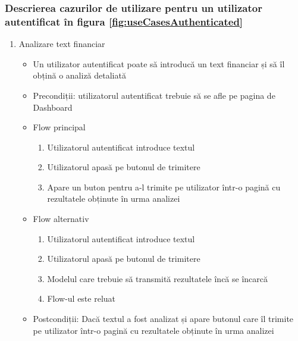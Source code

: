 \subsubsection{Descrierea cazurilor de utilizare pentru un utilizator autentificat în figura \ref{fig:useCasesAuthenticated}}
\begin{enumerate}
    \setlength\itemsep{0.5em}
    \item Analizare text financiar
    \begin{itemize}
        \setlength\itemsep{0.5em}
        \item Un utilizator autentificat poate să introducă un text financiar și să îl obțină o analiză detaliată
        \item Precondiții: utilizatorul autentificat trebuie să se afle pe pagina de Dashboard
        \item Flow principal
        \begin{enumerate}
            \setlength\itemsep{0.5em}
            \item Utilizatorul autentificat introduce textul
            \item Utilizatorul apasă pe butonul de trimitere
            \item Apare un buton pentru a-l trimite pe utilizator într-o pagină cu rezultatele obținute în urma analizei
        \end{enumerate}
        \item Flow alternativ
        \begin{enumerate}
            \setlength\itemsep{0.5em}
            \item Utilizatorul autentificat introduce textul
            \item Utilizatorul apasă pe butonul de trimitere
            \item Modelul care trebuie să transmită rezultatele încă se încarcă
            \item Flow-ul este reluat
        \end{enumerate}
        \item Postcondiții: Dacă textul a fost analizat și apare butonul care îl trimite pe utilizator într-o pagină cu rezultatele obținute în urma analizei
    \end{itemize}


\end{enumerate}
